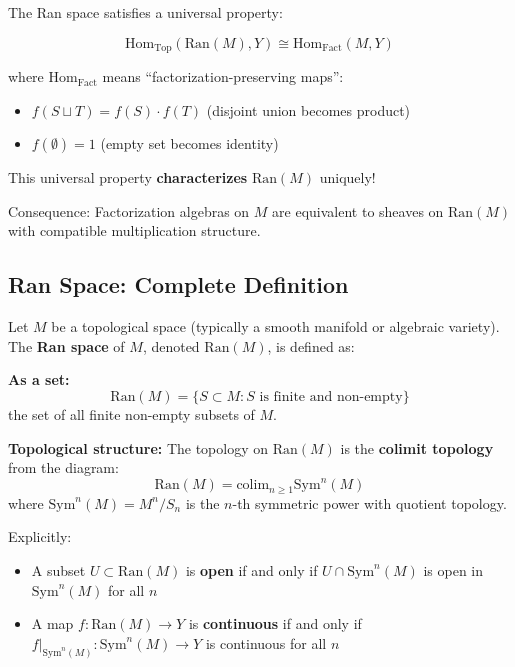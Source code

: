 \begin{principle}
The Ran space satisfies a universal property:

$$\text{Hom}_{\text{Top}}(\text{Ran}(M), Y) \cong 
   \text{Hom}_{\text{Fact}}(M, Y)$$

where $\text{Hom}_{\text{Fact}}$ means ``factorization-preserving maps'':
\begin{itemize}
\item $f(S \sqcup T) = f(S) \cdot f(T)$ (disjoint union becomes product)
\item $f(\emptyset) = 1$ (empty set becomes identity)
\end{itemize}

This universal property \textbf{characterizes} $\text{Ran}(M)$ uniquely!

Consequence: Factorization algebras on $M$ are equivalent to sheaves on $\text{Ran}(M)$ 
with compatible multiplication structure.
\end{principle}

\subsection{Ran Space: Complete Definition}

\begin{definition}
\label{def:ran-space-complete}
Let $M$ be a topological space (typically a smooth manifold or algebraic variety). 
The \textbf{Ran space} of $M$, denoted $\text{Ran}(M)$, is defined as:

\textbf{As a set:}
$$\text{Ran}(M) = \{S \subset M : S \text{ is finite and non-empty}\}$$
the set of all finite non-empty subsets of $M$.

\textbf{Topological structure:} The topology on $\text{Ran}(M)$ is the \textbf{colimit 
topology} from the diagram:
$$\text{Ran}(M) = \text{colim}_{n \geq 1} \text{Sym}^n(M)$$
where $\text{Sym}^n(M) = M^n/S_n$ is the $n$-th symmetric power with quotient topology.

Explicitly:
\begin{itemize}
\item A subset $U \subset \text{Ran}(M)$ is \textbf{open} if and only if 
   $U \cap \text{Sym}^n(M)$ is open in $\text{Sym}^n(M)$ for all $n$
   
\item A map $f: \text{Ran}(M) \to Y$ is \textbf{continuous} if and only if 
   $f|_{\text{Sym}^n(M)}: \text{Sym}^n(M) \to Y$ is continuous for all $n$
\end{itemize}
\end{definition}

